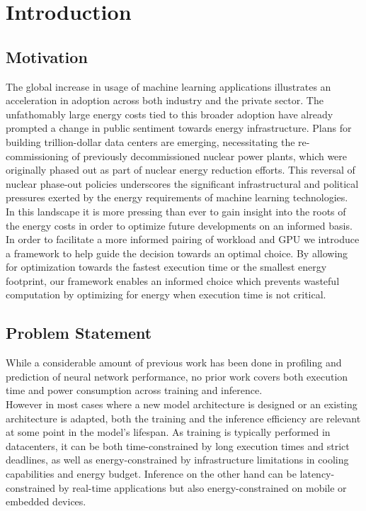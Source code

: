 \chapter{Introduction}\label{chap:introduction}

\section{Motivation}

The global increase in usage of machine learning applications
 illustrates an acceleration in adoption across
both industry and the private sector. The unfathomably
large energy costs tied to this broader adoption have
already prompted a change in public sentiment towards
energy infrastructure. Plans for building
trillion-dollar data centers are emerging, necessitating
the re-commissioning of previously decommissioned
nuclear power plants, which were originally phased
out as part of nuclear energy reduction efforts. This
reversal of nuclear phase-out policies underscores the
significant infrastructural and political pressures
exerted by the energy requirements of machine learning
technologies. \\
In this landscape it is more pressing than ever to gain
insight into the roots of the energy costs in order to
optimize future developments on an informed basis. \\
In order to facilitate a more informed pairing of workload 
and GPU we introduce a framework to help guide the decision 
towards an optimal choice. By allowing for optimization towards the fastest execution time or the smallest energy footprint, our framework enables an informed choice which prevents wasteful computation by optimizing for energy when execution time is not critical. 


\section{Problem Statement}
While a considerable amount of previous work has been done in
profiling and prediction of neural network performance, no prior work covers both execution time and power consumption across training and inference.\\
However in most cases where a new model architecture is designed or an existing architecture is adapted, both the training and the inference efficiency are relevant at some point in the model's lifespan. As training is typically performed in datacenters, it can be both time-constrained by long execution times and strict deadlines, as well as energy-constrained by infrastructure limitations in cooling capabilities and energy budget. Inference on the other hand can be latency-constrained by real-time applications but also energy-constrained on mobile or embedded devices. 

